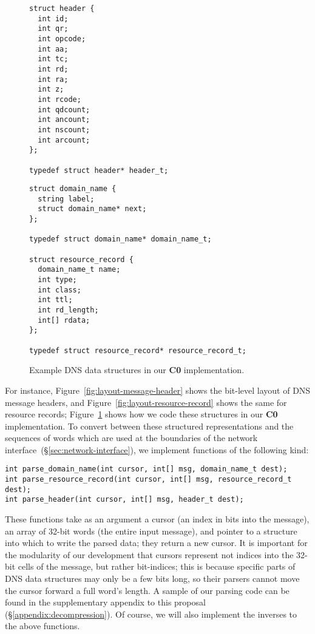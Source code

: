 \documentclass{article}
\newcommand\Kwd[1]{{\sffamily\bfseries{#1}}}
\begin{document}
\begin{figure}
  \begin{lstlisting}[frame=single]
struct header {
  int id;
  int qr;
  int opcode;
  int aa;
  int tc;
  int rd;
  int ra;
  int z;
  int rcode;
  int qdcount;
  int ancount;
  int nscount;
  int arcount;
};

typedef struct header* header_t;
  \end{lstlisting}

  \begin{lstlisting}[frame=single]
struct domain_name {
  string label;
  struct domain_name* next;
};

typedef struct domain_name* domain_name_t;

struct resource_record {
  domain_name_t name;
  int type;
  int class;
  int ttl;
  int rd_length;
  int[] rdata;
};

typedef struct resource_record* resource_record_t;
  \end{lstlisting}
  \caption{Example DNS data structures in our \Kwd{C0} implementation.}\label{fig:c0-data-structures}
\end{figure}

For instance, Figure~\ref{fig:layout-message-header} shows the
bit-level layout of DNS message headers, and
Figure~\ref{fig:layout-resource-record} shows the same for resource
records; Figure~\ref{fig:c0-data-structures} shows how we code these
structures in our \Kwd{C0} implementation. To convert between these
structured representations and the sequences of words which are used
at the boundaries of the network
interface~(\S\ref{sec:network-interface}), we implement functions of
the following kind:

\begin{lstlisting}
int parse_domain_name(int cursor, int[] msg, domain_name_t dest);
int parse_resource_record(int cursor, int[] msg, resource_record_t dest);
int parse_header(int cursor, int[] msg, header_t dest);
\end{lstlisting}

These functions take as an argument a cursor (an index in bits into
the message), an array of 32-bit words (the entire input message), and
pointer to a structure into which to write the parsed data; they
return a new cursor. It is important for the modularity of our
development that cursors represent not indices into the 32-bit cells
of the message, but rather bit-indices; this is because specific parts
of DNS data structures may only be a few bits long, so their parsers
cannot move the cursor forward a full word's length.
%
A sample of our parsing code can be found in the supplementary
appendix to this proposal (\S\ref{appendix:decompression}). Of
course, we will also implement the inverses to the above functions.
\end{document}
